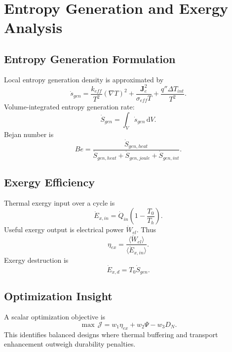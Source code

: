 \chapter{Entropy Generation and Exergy Analysis}\label{ch:exergy}

\section{Entropy Generation Formulation}
Local entropy generation density is approximated by
\begin{equation}\label{eq:entropy_local}
\dot{s}_{gen}=\frac{k_{eff}}{T^2}(\nabla T)^2+\frac{\mathbf{J}_e^2}{\sigma_{eff}T}+\frac{q''\Delta T_{int}}{T^2}.
\end{equation}
Volume-integrated entropy generation rate:
\begin{equation}\label{eq:entropy_total}
\dot{S}_{gen}=\int_V \dot{s}_{gen}\,\mathrm{d}V.
\end{equation}
Bejan number is
\begin{equation}\label{eq:bejan}
Be=\frac{\dot{S}_{gen,heat}}{\dot{S}_{gen,heat}+\dot{S}_{gen,joule}+\dot{S}_{gen,int}}.
\end{equation}

\section{Exergy Efficiency}
Thermal exergy input over a cycle is
\begin{equation}\label{eq:ex_in}
\dot{E}_{x,in}=\dot{Q}_{in}\left(1-\frac{T_0}{T_h}\right).
\end{equation}
Useful exergy output is electrical power $\dot{W}_{el}$. Thus
\begin{equation}\label{eq:ex_eff}
\eta_{ex}=\frac{\langle \dot{W}_{el}\rangle}{\langle \dot{E}_{x,in}\rangle}.
\end{equation}
Exergy destruction is
\begin{equation}\label{eq:ex_dest}
\dot{E}_{x,d}=T_0\dot{S}_{gen}.
\end{equation}

\section{Optimization Insight}
A scalar optimization objective is
\begin{equation}\label{eq:objective}
\max\,\mathcal{J}=w_1\eta_{ex}+w_2\Psi-w_3D_N.
\end{equation}
This identifies balanced designs where thermal buffering and transport enhancement outweigh durability penalties.

